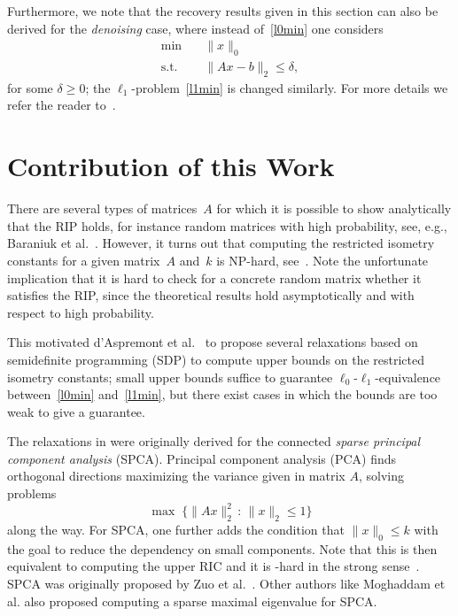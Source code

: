 \documentclass[journal]{IEEEtran}
\newcommand{\suchthat}{\,:\,}
\newcommand{\Norm}[2]{\lVert{#1}\rVert_{#2}}
\newcommand{\NP}{\text{NP}}
\begin{document}
Furthermore, we note that the recovery results given in this section can also be derived 
for the \emph{denoising} case, where instead of~\eqref{l0min} one considers
\begin{equation}\label{l0minDenoising}\tag{$P_0^\delta$}
 \begin{aligned}
  \min \quad & \Norm{x}{0} \\
  \text{s.t.} \quad & \Norm{Ax - b}{2} \leq \delta, 
 \end{aligned}
\end{equation}
for some $\delta \geq 0$; the $\ell_1$-problem~\eqref{l1min} is changed
similarly. For more details we refer the reader to~\cite{FouR13}.


\section{Contribution of this Work}

\noindent
There are several types of matrices~$A$ for which it is possible
to show analytically that the RIP holds, for instance random
matrices with high probability, see, e.g., Baraniuk et al.~\cite{BDDW08}.
However, it turns out that computing the restricted isometry
constants for a given matrix~$A$ and~$k$ is NP-hard, see~\cite{PT14}. 
Note the unfortunate implication that it is hard to check for a
concrete random matrix whether it satisfies the RIP, since the theoretical
results hold asymptotically and with respect to high probability.

This motivated d'Aspremont et al.~\cite{Asp08,Asp07} to propose several
relaxations based on semidefinite programming (SDP) to compute upper bounds on the restricted isometry
constants; small upper bounds suffice to guarantee
$\ell_0$-$\ell_1$-equivalence between~\eqref{l0min} and~\eqref{l1min}, but
there exist cases in which the bounds are too weak to give a guarantee.

The relaxations in \cite{Asp08,Asp07} were originally derived for the
connected \emph{sparse principal component analysis} (SPCA). Principal
component analysis (PCA) finds orthogonal directions maximizing the 
variance given in matrix $A$, solving problems
\[
\max\; \{ \Norm{A x}{2}^2 \suchthat \Norm{x}{2} \leq 1\}
\]
along the way. For SPCA, one further adds the condition that $\Norm{x}{0}
\leq k$ with the goal to reduce the dependency on small components. Note
that this is then equivalent to computing the upper RIC and it is \NP-hard
in the strong sense~\cite{PT14}. SPCA was
originally proposed by Zuo et al.~\cite{SPCA}. Other authors like Moghaddam et al.
\cite{sbSPCA} also proposed computing a sparse maximal eigenvalue for SPCA.
\end{document}
